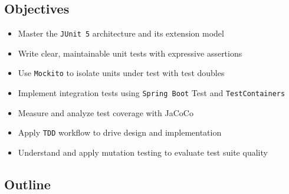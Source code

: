 \documentclass[
]{article}
\providecommand{\tightlist}{%
  \setlength{\itemsep}{0pt}\setlength{\parskip}{0pt}}
\begin{document}
\subsection{Objectives}\label{objectives}

\begin{itemize}
\tightlist
\item
  Master the \texttt{JUnit\ 5} architecture and its extension model
\item
  Write clear, maintainable unit tests with expressive assertions
\item
  Use \texttt{Mockito} to isolate units under test with test doubles
\item
  Implement integration tests using \texttt{Spring\ Boot} Test and
  \texttt{TestContainers}
\item
  Measure and analyze test coverage with JaCoCo
\item
  Apply \texttt{TDD} workflow to drive design and implementation
\item
  Understand and apply mutation testing to evaluate test suite quality
\end{itemize}

\subsection{Outline}\label{outline}
\end{document}
